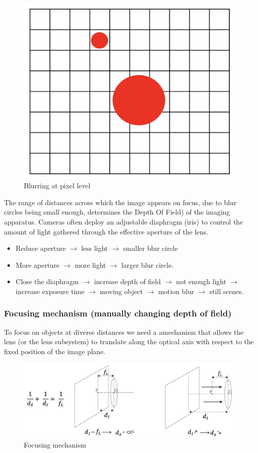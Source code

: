 \documentclass{article}
\begin{document}
\begin{figure}[htbp]
  \centering
  \includegraphics[width=0.55\linewidth]{./img/diaphragm.jpg}
  \caption{Blurring at pixel level}
  \label{fig:diaphragm}
\end{figure}

The range of distances across which the image appears on focus, due to blur circles being small enough, determines the Depth Of Field) of the imaging apparatus.
Cameras often deploy an adjustable diaphragm (iris) to control the amount of light gathered through the effective aperture of the lens.
\begin{itemize}
  \item Reduce aperture $\rightarrow$ less light $\rightarrow$ smaller blur circle
  \item More aperture $\rightarrow$ more light $\rightarrow$ larger blur circle.
  \item Close the diaphragm $\rightarrow$ increase depth of field $\rightarrow$ not enough light $\rightarrow$ increase exposure time $\rightarrow$ moving object $\rightarrow$ motion blur $\rightarrow$ still scenes.
\end{itemize}

\subsubsection{Focusing mechanism (manually changing depth of field)}
To focus on objects at diverse distances we need a amechanism that allows the lens (or the lens subsystem) to translate along the optical axis with respect to the fixed position of the image plane.

\begin{figure}[htbp]
  \centering
  \includegraphics[width=0.7\linewidth]{./img/focusing_mechanism.jpg}
  \caption{Focusing mechanism}
  \label{fig:focusing_mechanism}
\end{figure}
\end{document}
